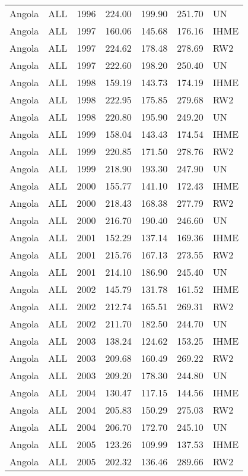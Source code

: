 \begin{longtable}{lllrrrl}
  Angola & ALL & 1996 & 224.00 & 199.90 & 251.70 & UN \\ 
  Angola & ALL & 1997 & 160.06 & 145.68 & 176.16 & IHME \\ 
  Angola & ALL & 1997 & 224.62 & 178.48 & 278.69 & RW2 \\ 
  Angola & ALL & 1997 & 222.60 & 198.20 & 250.40 & UN \\ 
  Angola & ALL & 1998 & 159.19 & 143.73 & 174.19 & IHME \\ 
  Angola & ALL & 1998 & 222.95 & 175.85 & 279.68 & RW2 \\ 
  Angola & ALL & 1998 & 220.80 & 195.90 & 249.20 & UN \\ 
  Angola & ALL & 1999 & 158.04 & 143.43 & 174.54 & IHME \\ 
  Angola & ALL & 1999 & 220.85 & 171.50 & 278.76 & RW2 \\ 
  Angola & ALL & 1999 & 218.90 & 193.30 & 247.90 & UN \\ 
  Angola & ALL & 2000 & 155.77 & 141.10 & 172.43 & IHME \\ 
  Angola & ALL & 2000 & 218.43 & 168.38 & 277.79 & RW2 \\ 
  Angola & ALL & 2000 & 216.70 & 190.40 & 246.60 & UN \\ 
  Angola & ALL & 2001 & 152.29 & 137.14 & 169.36 & IHME \\ 
  Angola & ALL & 2001 & 215.76 & 167.13 & 273.55 & RW2 \\ 
  Angola & ALL & 2001 & 214.10 & 186.90 & 245.40 & UN \\ 
  Angola & ALL & 2002 & 145.79 & 131.78 & 161.52 & IHME \\ 
  Angola & ALL & 2002 & 212.74 & 165.51 & 269.31 & RW2 \\ 
  Angola & ALL & 2002 & 211.70 & 182.50 & 244.70 & UN \\ 
  Angola & ALL & 2003 & 138.24 & 124.62 & 153.25 & IHME \\ 
  Angola & ALL & 2003 & 209.68 & 160.49 & 269.22 & RW2 \\ 
  Angola & ALL & 2003 & 209.20 & 178.30 & 244.80 & UN \\ 
  Angola & ALL & 2004 & 130.47 & 117.15 & 144.56 & IHME \\ 
  Angola & ALL & 2004 & 205.83 & 150.29 & 275.03 & RW2 \\ 
  Angola & ALL & 2004 & 206.70 & 172.70 & 245.10 & UN \\ 
  Angola & ALL & 2005 & 123.26 & 109.99 & 137.53 & IHME \\ 
  Angola & ALL & 2005 & 202.32 & 136.46 & 289.66 & RW2 \\ 

\end{longtable}
